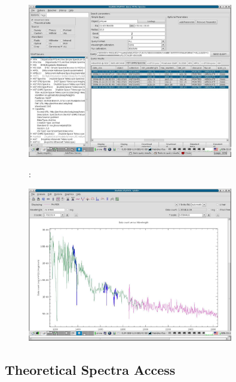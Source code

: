 \documentclass[final,authoryear,5p,times,twocolumn]{elsarticle}
\begin{document}
\begin{figure}[Ht]
\begin{center}
\includegraphics[width=0.8\textwidth]{hst_query.pdf}
\caption{}
\label{fig:hst_query}
:
\end{center}
\end{figure}


\begin{figure}[t]
\begin{center}
\includegraphics[width=0.8\textwidth]{iuehst2.pdf}
\caption{}
\label{fig:iuehst2}
\end{center}
\end{figure}



\subsection{ Theoretical Spectra Access}
\end{document}
